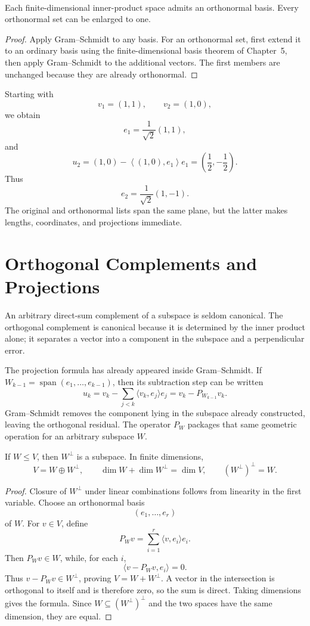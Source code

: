 \begin{corollary}\label{cor:orthonormal-bases}\leavevmode\\
Each finite-dimensional inner-product space admits an orthonormal basis.
Every orthonormal set can be enlarged to one.
\end{corollary}
\begin{proof}
Apply Gram--Schmidt to any basis. For an orthonormal set, first extend it to
an ordinary basis using the finite-dimensional basis theorem of Chapter~5,
then apply Gram--Schmidt to the additional vectors. The first members are
unchanged because they are already orthonormal.
\end{proof}

\begin{example}
Starting with
\[
v_1=(1,1),
\qquad
v_2=(1,0),
\]
we obtain
\[
e_1=\frac1{\sqrt2}(1,1),
\]
and
\[
u_2=(1,0)-\left\langle(1,0),e_1\right\rangle e_1
=\left(\frac12,-\frac12\right).
\]
Thus
\[
e_2=\frac1{\sqrt2}(1,-1).
\]
The original and orthonormal lists span the same plane, but the latter makes
lengths, coordinates, and projections immediate.
\end{example}

\section{Orthogonal Complements and Projections}

An arbitrary direct-sum complement of a subspace is seldom canonical. The
orthogonal complement is canonical because it is determined by the inner
product alone; it separates a vector into a component in the subspace and a
perpendicular error.

The projection formula has already appeared inside Gram--Schmidt. If
\(W_{k-1}=\operatorname{span}(e_1,\ldots,e_{k-1})\), then its subtraction step
can be written
\[
u_k=v_k-\sum_{j<k}\langle v_k,e_j\rangle e_j
=v_k-P_{W_{k-1}}v_k.
\]
Gram--Schmidt removes the component lying in the subspace already constructed,
leaving the orthogonal residual. The operator \(P_W\) packages that same
geometric operation for an arbitrary subspace \(W\).

\begin{proposition}\label{prop:orthogonal-complements}
If \(W\leq V\), then \(W^\perp\) is a subspace. In finite dimensions,
\[
V=W\oplus W^\perp,
\qquad
\dim W+\dim W^\perp=\dim V,
\qquad
(W^\perp)^\perp=W.
\]
\end{proposition}
\begin{proof}
Closure of \(W^\perp\) under linear combinations follows from linearity in
the first variable. Choose an orthonormal basis
\[
(e_1,\ldots,e_r)
\]
of \(W\). For \(v\in V\), define
\[
P_Wv=\sum_{i=1}^r\langle v,e_i\rangle e_i.
\]
\noindent Then \(P_Wv\in W\), while, for each \(i\),
\[
\langle v-P_Wv,e_i\rangle=0.
\]
\noindent Thus \(v-P_Wv\in W^\perp\), proving \(V=W+W^\perp\). A vector in the
intersection is orthogonal to itself and is therefore zero, so the sum is
direct. Taking dimensions gives the formula. Since \(W\subseteq
(W^\perp)^\perp\) and the two spaces have the same dimension, they are
equal.
\end{proof}

